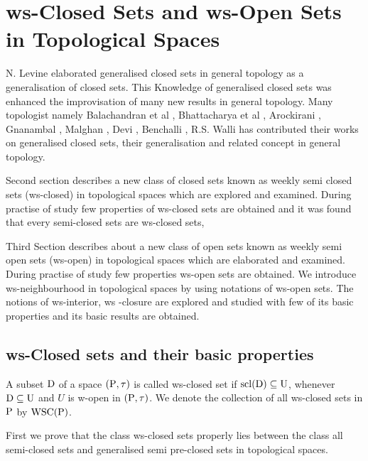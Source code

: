 \chapter{ws-Closed Sets and ws-Open Sets in Topological Spaces}
\graphicspath{{Chapter2/Chapter2Figs/EPS/}{Chapter2/Chapter2Figs/}}

N. Levine \cite{Levine} elaborated generalised closed sets in general topology as a generalisation of closed sets. This Knowledge of generalised closed sets was enhanced the improvisation of many new results in general topology. Many topologist namely Balachandran et al \cite{Balachandran}, Bhattacharya et al \cite{Bhattacharya}, Arockirani \cite{Arockiarani}, Gnanambal \cite{Gnanambal}, Malghan \cite{Malghan}, Devi \cite{Devi}, Benchalli \cite{Benchalli}, R.S. Walli \cite{Wali2} has contributed their works on generalised closed sets, their generalisation and related concept in general topology.

Second section describes a new class of closed sets known as weekly semi closed sets (ws-closed) in topological spaces which are explored and examined. During practise of study few properties of ws-closed sets are obtained and it was found that every semi-closed sets are ws-closed sets,

Third Section describes about a new class of open sets known as weekly semi open sets (ws-open) in topological spaces which are elaborated and examined. During practise of study few properties ws-open sets are obtained. We introduce ws-neighbourhood in topological spaces by using notations of ws-open sets. The notions of ws-interior, ws -closure are explored and studied with few of its basic properties and its basic results are obtained.

\section{ws-Closed sets and their basic properties}\label{sec}

\begin{dfn}\label{defi2.2.1}
A subset $\mathrm{D}$ of a space $(\mathrm{P},\tau)$ is called ws-closed set if $\mathrm{scl}(\mathrm{D}) \subseteq \mathrm{U}$, whenever $\mathrm{D}\subseteq \mathrm{U}$ and $U$ is w-open in $(\mathrm{P},\tau)$. We denote the collection of all ws-closed sets in $\mathrm{P}$ by $\mbox{WSC}(\mathrm{P})$.
\end{dfn}

First we prove that the class ws-closed sets properly lies between the class all semi-closed sets and generalised semi pre-closed sets in topological spaces.

